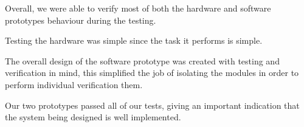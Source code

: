 Overall, we were able to verify most of both the hardware and software prototypes behaviour during the testing.

Testing the hardware was simple since the task it performs is simple. 

The overall design of the software prototype was created with testing and verification in mind, this simplified the job of isolating the modules in order to perform individual verification them.

Our two prototypes passed all of our tests, giving an important indication that the system being designed is well implemented.
